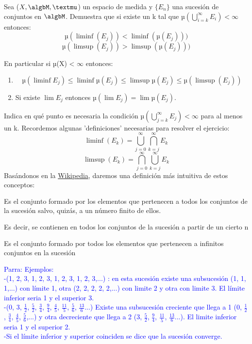 \begin{problem}[6]
Sea ($X, \algbM, µ$) un espacio de medida y $\{E_n\} $ una sucesión de conjuntos en $\algbM$. Demuestra que si existe un k tal que $µ(\bigcup_{i=k}^{\infty}E_i) < \infty$ entonces:
\[µ(\liminf (E_j))<\liminf (µ(E_j)))\]
\[µ(\limsup (E_j))>\limsup (µ(E_j)))\]

En particular si µ(X) < $\infty$ entonces:
\begin{enumerate}
\item
\[µ(\liminf E_j) \leq \liminf µ(E_j) \leq \limsup µ(E_j) \leq µ(\limsup(E_j))\]
\item Si existe $\lim E_j$ entonces $µ(\lim E_j)=\lim µ(E_j)$.
\end{enumerate}
Indica en qué punto es necesaria la condición $µ(\bigcup_{j=k}^{\infty}E_j)< \infty$ para al menos un k.
\solution
Recordemos algunas 'definiciones' necesarias para resolver el ejercicio:
\[\liminf (E_k) = \bigcup_{j=0}^{\infty} \bigcap_{k=j}^{\infty} E_k\]
\[\limsup (E_k)= \bigcap_{j=0}^{\infty} \bigcup_{k=j}^{\infty} E_k\]
Basándonos en la \href{http://en.wikipedia.org/wiki/Limit_superior_and_limit_inferior}{Wikipedia}, daremos una definición más intuitiva de estos conceptos:

\begin{defn}
Es el conjunto formado por los elementos que pertenecen a todos los conjuntos de la sucesión salvo, quizás, a un número finito de ellos.

Es decir, se contienen en todos los conjuntos de la sucesión a partir de un cierto n
\end{defn}

\begin{defn}
Es el conjunto formado por todos los elementos que pertenecen a infinitos conjuntos en la sucesión
\end{defn}

\textcolor{blue}{Parra: Ejemplos:\\
-(1, 2, 3, 1, 2, 3, 1, 2, 3, 1, 2, 3,...) : en esta sucesión existe una subsucesión (1, 1, 1,...) con límite 1, otra (2, 2, 2, 2, 2,...) con limite 2 y otra con limite 3. El límite inferior seria 1 y el superior 3.\\
-(0, 3, $\frac{1}{2}$, $\frac{5}{2}$, $\frac{3}{4}$, $\frac{9}{4}$, $\frac{4}{5}$, $\frac{11}{5}$, $\frac{5}{6}$, $\frac{13}{6}$...) Existe una subsucesión creciente que llega a 1 (0, $\frac{1}{2}$, $\frac{3}{4}$, $\frac{4}{5}$, $\frac{5}{6}$,...) y otra decreciente que llega a 2 (3, $\frac{5}{2}$, $\frac{9}{4}$, $\frac{11}{5}$, $\frac{13}{6}$...). El limite inferior seria 1 y el superior 2.\\
-Si el límite inferior y superior coinciden se dice que la sucesión converge.}


\end{problem}

